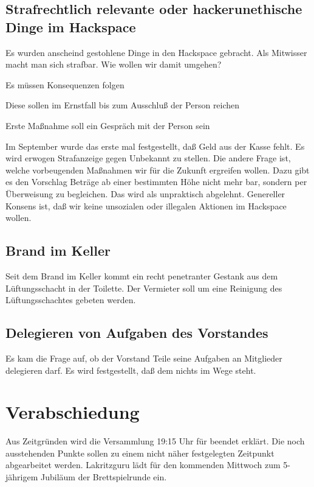 \documentclass[]{scrartcl}
\newenvironment{packed_item}{
\begin{itemize}
\setlength{\itemsep}{-5pt}
\setlength{\parsep}{0pt}
}{\end{itemize}}
\begin{document}
\begin{multicols}{2}
\subsection{Strafrechtlich relevante oder hackerunethische Dinge im
Hackspace}
Es wurden anscheind gestohlene Dinge in den Hackspace gebracht. Als
Mitwisser macht man sich strafbar. Wie wollen wir damit umgehen?
\begin{packed_item}
\item Es müssen Konsequenzen folgen
\item Diese sollen im Ernstfall bis zum Ausschluß der Person reichen
\item Erste Maßnahme soll ein Gespräch mit der Person sein
\end{packed_item}
Im September wurde das erste mal festgestellt, daß Geld aus der Kasse fehlt.
Es wird erwogen Strafanzeige gegen Unbekannt zu stellen. Die andere Frage
ist, welche vorbeugenden Maßnahmen wir für die Zukunft ergreifen wollen.
Dazu gibt es den Vorschlag Beträge ab einer bestimmten Höhe nicht mehr bar,
sondern per Überweisung zu begleichen. Das wird als unpraktisch abgelehnt.
Genereller Konsens ist, daß wir keine unsozialen oder illegalen Aktionen im
Hackspace wollen.

\subsection{Brand im Keller}
Seit dem Brand im Keller kommt ein recht penetranter Gestank aus dem
Lüftungsschacht in der Toilette. Der Vermieter soll um eine Reinigung des
Lüftungsschachtes gebeten werden.

\subsection{Delegieren von Aufgaben des Vorstandes}
Es kam die Frage auf, ob der Vorstand Teile seine Aufgaben an Mitglieder
delegieren darf. Es wird festgestellt, daß dem nichts im Wege steht.

\section{Verabschiedung}
Aus Zeitgründen wird die Versammlung 19:15 Uhr für beendet erklärt. Die
noch ausstehenden Punkte sollen zu einem nicht näher festgelegten Zeitpunkt
abgearbeitet werden. Lakritzguru lädt für den kommenden Mittwoch zum 5-jährigem
Jubiläum der Brettspielrunde ein.

\end{multicols}
\end{document}
